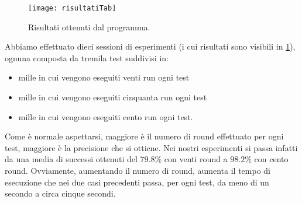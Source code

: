 				\begin{figure}
					\begin{center}
						\texttt{[image: risultatiTab]}
						\caption[Risultati SPARK]{Risultati ottenuti dal programma.}
						\label{fig:risultati}
					\end{center}
				\end{figure}
			
				Abbiamo effettuato dieci sessioni di esperimenti (i cui risultati sono visibili in \cref{fig:risultati}), ognuna composta da tremila test suddivisi in:
				\begin{itemize}
					\item mille in cui vengono eseguiti venti run ogni test
					\item mille in cui vengono eseguiti cinquanta run ogni test
					\item mille in cui vengono eseguiti cento run ogni test.
				\end{itemize}
				
				Come è normale aspettarsi, maggiore è il numero di round effettuato per ogni test, maggiore è la precisione che si ottiene. Nei nostri esperimenti si passa infatti da una media di successi ottenuti del $79.8\%$ con venti round a $98.2\%$ con cento round. Ovviamente, aumentando il numero di round, aumenta il tempo di esecuzione che nei due casi precedenti passa, per ogni test, da meno di un secondo a circa cinque secondi.
					
